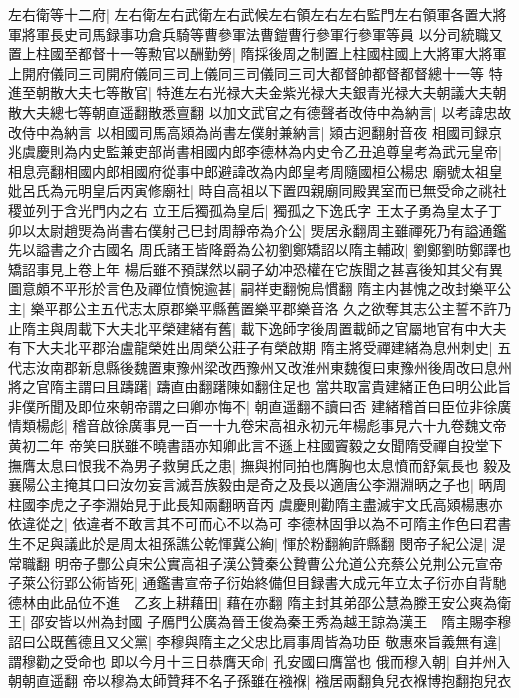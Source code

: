 左右衛等十二府|{
	左右衛左右武衛左右武候左右領左右左右監門左右領軍各置大將軍將軍長史司馬録事功倉兵騎等曹參軍法曹鎧曹行參軍行參軍等員}
以分司統職又置上柱國至都督十一等勲官以酬勤勞|{
	隋採後周之制置上柱國柱國上大將軍大將軍上開府儀同三司開府儀同三司上儀同三司儀同三司大都督帥都督都督總十一等}
特進至朝散大夫七等散官|{
	特進左右光禄大夫金紫光禄大夫銀青光禄大夫朝議大夫朝散大夫總七等朝直遥翻散悉亶翻}
以加文武官之有德聲者改侍中為納言|{
	以考諱忠故改侍中為納言}
以相國司馬高熲為尚書左僕射兼納言|{
	熲古迥翻射音夜}
相國司録京兆虞慶則為内史監兼吏部尚書相國内郎李德林為内史令乙丑追尊皇考為武元皇帝|{
	相息亮翻相國内郎相國府從事中郎避諱改為内郎皇考周隨國桓公楊忠}
廟號太祖皇妣呂氏為元明皇后丙寅修廟社|{
	時自高祖以下置四親廟同殿異室而已無受命之祧社稷並列于含光門内之右}
立王后獨孤為皇后|{
	獨孤之下逸氏字}
王太子勇為皇太子丁卯以太尉趙煚為尚書右僕射己巳封周靜帝為介公|{
	煚居永翻周主雖禪死乃有謚通鑑先以謚書之介古國名}
周氏諸王皆降爵為公初劉鄭矯詔以隋主輔政|{
	劉鄭劉昉鄭譯也矯詔事見上卷上年}
楊后雖不預謀然以嗣子幼冲恐權在它族聞之甚喜後知其父有異圖意頗不平形於言色及禪位憤惋逾甚|{
	嗣祥吏翻惋烏慣翻}
隋主内甚愧之改封樂平公主|{
	樂平郡公主五代志太原郡樂平縣舊置樂平郡樂音洛}
久之欲奪其志公主誓不許乃止隋主與周載下大夫北平榮建緒有舊|{
	載下逸師字後周置載師之官屬地官有中大夫有下大夫北平郡治盧龍榮姓出周榮公莊子有榮啟期}
隋主將受禪建緒為息州刺史|{
	五代志汝南郡新息縣後魏置東豫州梁改西豫州又改淮州東魏復曰東豫州後周改曰息州}
將之官隋主謂曰且躊躇|{
	躊直由翻躇陳如翻住足也}
當共取富貴建緒正色曰明公此旨非僕所聞及即位來朝帝謂之曰卿亦悔不|{
	朝直遥翻不讀曰否}
建緒稽首曰臣位非徐廣情類楊彪|{
	稽音啟徐廣事見一百一十九卷宋高祖永初元年楊彪事見六十九卷魏文帝黄初二年}
帝笑曰朕雖不曉書語亦知卿此言不遜上柱國竇毅之女聞隋受禪自投堂下撫膺太息曰恨我不為男子救舅氏之患|{
	撫與拊同拍也膺胸也太息憤而舒氣長也}
毅及襄陽公主掩其口曰汝勿妄言滅吾族毅由是奇之及長以適唐公李淵淵昞之子也|{
	昞周柱國李虎之子李淵始見于此長知兩翻昞音丙}
虞慶則勸隋主盡滅宇文氏高熲楊惠亦依違從之|{
	依違者不敢言其不可而心不以為可}
李德林固爭以為不可隋主作色曰君書生不足與議此於是周太祖孫譙公乾惲冀公絢|{
	惲於粉翻絢許縣翻}
閔帝子紀公湜|{
	湜常職翻}
明帝子酆公貞宋公實高祖子漢公贊秦公贄曹公允道公充蔡公兑荆公元宣帝子萊公衍郢公術皆死|{
	通鑑書宣帝子衍始終備但目録書大成元年立太子衍亦自背馳}
德林由此品位不進　乙亥上耕藉田|{
	藉在亦翻}
隋主封其弟邵公慧為滕王安公爽為衛王|{
	邵安皆以州為封國}
子鴈門公廣為晉王俊為秦王秀為越王諒為漢王　隋主賜李穆詔曰公既舊德且又父黨|{
	李穆與隋主之父忠比肩事周皆為功臣}
敬惠來旨義無有違|{
	謂穆勸之受命也}
即以今月十三日恭膺天命|{
	孔安國曰膺當也}
俄而穆入朝|{
	自并州入朝朝直遥翻}
帝以穆為太師贊拜不名子孫雖在襁褓|{
	襁居兩翻負兒衣褓博抱翻抱兒衣}
